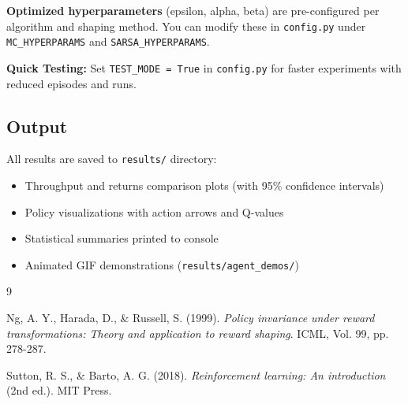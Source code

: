 \documentclass[11pt,a4paper]{article}
\begin{document}
\textbf{Optimized hyperparameters} (epsilon, alpha, beta) are pre-configured per algorithm and shaping method. You can modify these in \texttt{config.py} under \texttt{MC\_HYPERPARAMS} and \texttt{SARSA\_HYPERPARAMS}.

\textbf{Quick Testing:} Set \texttt{TEST\_MODE = True} in \texttt{config.py} for faster experiments with reduced episodes and runs.

\subsection*{Output}

All results are saved to \texttt{results/} directory:
\begin{itemize}
    \item Throughput and returns comparison plots (with 95\% confidence intervals)
    \item Policy visualizations with action arrows and Q-values
    \item Statistical summaries printed to console
    \item Animated GIF demonstrations (\texttt{results/agent\_demos/})
\end{itemize}

\begin{thebibliography}{9}

Ng, A. Y., Harada, D., \& Russell, S. (1999).
\textit{Policy invariance under reward transformations: Theory and application to reward shaping}.
ICML, Vol. 99, pp. 278-287.

Sutton, R. S., \& Barto, A. G. (2018).
\textit{Reinforcement learning: An introduction} (2nd ed.).
MIT Press.

\end{thebibliography}
\end{document}
